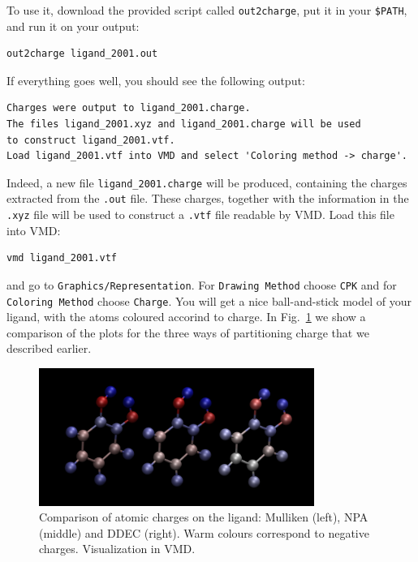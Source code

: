 \documentclass{article}
\newcommand{\vmd}[1]{\texttt{#1}}
\begin{document}
To use it, download the provided script called \texttt{out2charge}, put it in your \texttt{\$PATH}, and run it on your output:

\begin{verbatim}
out2charge ligand_2001.out    
\end{verbatim}

If everything goes well, you should see the following output:

\begin{verbatim}
Charges were output to ligand_2001.charge.
The files ligand_2001.xyz and ligand_2001.charge will be used
to construct ligand_2001.vtf.
Load ligand_2001.vtf into VMD and select 'Coloring method -> charge'.
\end{verbatim}

Indeed, a new file \texttt{ligand\_2001.charge} will be produced, containing the charges extracted from the \texttt{.out} file. These charges, together with the information in the \texttt{.xyz} file will be used to construct a \texttt{.vtf} file readable by VMD. Load this file into VMD:

\begin{verbatim}
vmd ligand_2001.vtf
\end{verbatim}

\noindent{}and go to \vmd{Graphics/Representation}. For \vmd{Drawing Method} choose \vmd{CPK} and for \vmd{Coloring Method} choose \vmd{Charge}. You will get a nice ball-and-stick model of your ligand, with the atoms coloured accorind to charge. In Fig.~\ref{fig:charges} we show a comparison of the plots for the three ways of partitioning charge that we described earlier.

\begin{figure}[htb]
    \centering
    \includegraphics[width=0.8\textwidth]{vmdscene.pov.png}
    \caption{Comparison of atomic charges on the ligand: Mulliken (left), NPA (middle) and DDEC (right). Warm colours correspond to negative charges. Visualization in VMD.}
    \label{fig:charges}
\end{figure}

\newpage
\printbibliography
\end{document}
